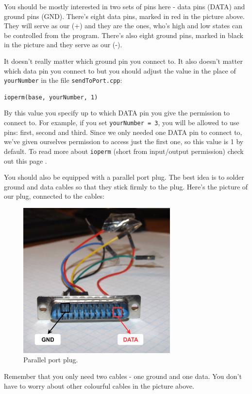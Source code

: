 \documentclass[12pt]{report}
\begin{document}
You should be mostly interested in two sets of pins here - data pins (DATA) and ground pins (GND). There's eight data pins, marked in red in the picture above. They will serve as our (+) and they are the ones, who's high and low states can be controlled from the program. There's also eight ground pins, marked in black in the picture and they serve as our (-).

It doesn't really matter which ground pin you connect to. It also doesn't matter which data pin you connect to but you should adjust the value in the place of \verb|yourNumber| in the file \verb|sendToPort.cpp|:

\begin{snugshade}
\verb|ioperm(base, yourNumber, 1)|
\end{snugshade}

By this value you specify up to which DATA pin you give the permission to connect to. For example, if you set \verb|yourNumber = 3|, you will be allowed to use pins: first, second and third. Since we only needed one DATA pin to connect to, we've given ourselves permission to access just the first one, so this value is 1 by default. To read more about \verb|ioperm| (short from input/output permission) check out this page \cite{ioperm}.

You should also be equipped with a parallel port plug. The best idea is to solder ground and data cables so that they stick firmly to the plug. Here's the picture of our plug, connected to the cables:

\begin{figure}[H]
\centering\includegraphics[width=8cm]{parport_plug}
\caption{Parallel port plug.}				
\label{fig:parport_plug}
\end{figure}

Remember that you only need two cables - one ground and one data. You don't have to worry about other colourful cables in the picture above.
\end{document}
